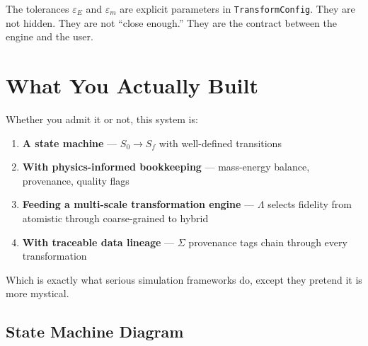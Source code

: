 \documentclass[11pt]{article}
\begin{document}
The tolerances $\varepsilon_E$ and $\varepsilon_m$ are explicit parameters in \texttt{TransformConfig}. They are not hidden. They are not ``close enough.'' They are the contract between the engine and the user.

\section{What You Actually Built}

Whether you admit it or not, this system is:

\begin{enumerate}
  \item \textbf{A state machine} --- $S_0 \to S_f$ with well-defined transitions
  \item \textbf{With physics-informed bookkeeping} --- mass-energy balance, provenance, quality flags
  \item \textbf{Feeding a multi-scale transformation engine} --- $\Lambda$ selects fidelity from atomistic through coarse-grained to hybrid
  \item \textbf{With traceable data lineage} --- $\Sigma$ provenance tags chain through every transformation
\end{enumerate}

Which is exactly what serious simulation frameworks do, except they pretend it is more mystical.

\subsection{State Machine Diagram}
\end{document}
